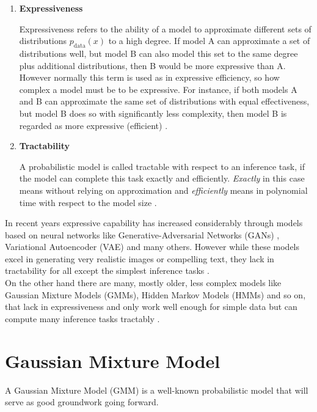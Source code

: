 \begin{enumerate}
    \item \textbf{Expressiveness} 
    
    Expressiveness refers to the ability of a model to approximate different sets of distributions $p_{\text{data}}(x)$ to a high degree. If model A can approximate a set of 
    distributions well, but model B can also model this set to the same degree plus additional distributions, then B would be more expressive than A.
    However normally this term is used as in expressive efficiency, so how complex a model must be 
    to be expressive.  For instance, if both models A and B can approximate the same set of distributions with equal effectiveness, but model B does so with significantly less complexity, then model B is regarded as more expressive (efficient) \cite{pc_intro}.
    \\
    \item \textbf{Tractability} 
    
    A probabilistic model is called tractable with respect to an inference task, if the model can complete this 
    task exactly and efficiently. \emph{Exactly} in this case means without relying on approximation and \emph{efficiently} 
    means in polynomial time with respect to the model size \cite{pc_intro}.
\end{enumerate}


In recent years expressive capability has increased considerably through models based on neural networks like Generative-Adversarial
Networks (GANs) \cite{gan}, Variational Autoencoder (VAE) \cite{vae} and many others. However while these models excel in generating 
very realistic images or compelling text, they lack in tractability for all except the simplest inference tasks
\cite{pc_intro}. \\

On the other hand there are many, mostly older, less complex models like Gaussian Mixture Models (GMMs), Hidden Markov Models (HMMs) and so on, 
that lack in expressiveness and only work well enough for simple data but can compute many inference tasks tractably \cite{ml_book}.

\section{Gaussian Mixture Model}
\label{sec:gmm}

A Gaussian Mixture Model (GMM) \cite{ml_book} is a well-known probabilistic model that will serve as good groundwork 
going forward.

